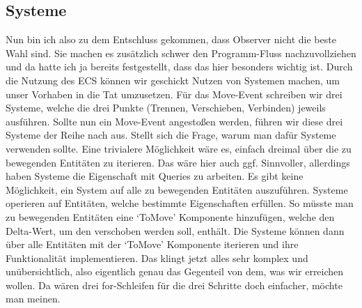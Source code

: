 \documentclass{article}
\begin{document}
    \subsection{Systeme}
    Nun bin ich also zu dem Entschluss gekommen, dass Observer nicht die beste Wahl sind.
    Sie machen es zusätzlich schwer den Programm-Fluss
    nachzuvollziehen und da hatte ich ja bereits festgestellt, dass das hier besonders wichtig ist.
    Durch die Nutzung des ECS können wir geschickt Nutzen von Systemen machen, um unser Vorhaben in die Tat umzusetzen.
    Für das Move-Event schreiben wir drei Systeme, welche die drei Punkte (Trennen, Verschieben, Verbinden) jeweils ausführen.
    Sollte nun ein Move-Event angestoßen werden, führen wir diese drei Systeme der Reihe nach aus.
    Stellt sich die Frage, warum man dafür Systeme verwenden sollte.
    Eine trivialere Möglichkeit wäre es, einfach dreimal über die zu bewegenden Entitäten zu iterieren.
    Das wäre hier auch ggf. Sinnvoller, allerdings haben Systeme die Eigenschaft mit Queries zu arbeiten.
    Es gibt keine Möglichkeit, ein System auf alle zu bewegenden Entitäten auszuführen.
    Systeme operieren auf Entitäten, welche bestimmte Eigenschaften erfüllen.
    So müsste man zu bewegenden Entitäten eine `ToMove' Komponente hinzufügen,
    welche den Delta-Wert, um den verschoben werden soll, enthält.
    Die Systeme können dann über alle Entitäten mit der `ToMove' Komponente iterieren und ihre Funktionalität implementieren.
    Das klingt jetzt alles sehr komplex und unübersichtlich, also eigentlich genau das Gegenteil von dem, was wir erreichen wollen.
    Da wären drei for-Schleifen für die drei Schritte doch einfacher, möchte man meinen.
\end{document}
